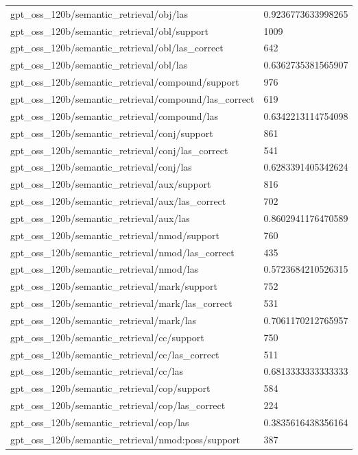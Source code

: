 \begin{tabular}{ll}
gpt\_oss\_120b/semantic\_retrieval/obj/las & 0.9236773633998265 \\
gpt\_oss\_120b/semantic\_retrieval/obl/support & 1009 \\
gpt\_oss\_120b/semantic\_retrieval/obl/las\_correct & 642 \\
gpt\_oss\_120b/semantic\_retrieval/obl/las & 0.6362735381565907 \\
gpt\_oss\_120b/semantic\_retrieval/compound/support & 976 \\
gpt\_oss\_120b/semantic\_retrieval/compound/las\_correct & 619 \\
gpt\_oss\_120b/semantic\_retrieval/compound/las & 0.6342213114754098 \\
gpt\_oss\_120b/semantic\_retrieval/conj/support & 861 \\
gpt\_oss\_120b/semantic\_retrieval/conj/las\_correct & 541 \\
gpt\_oss\_120b/semantic\_retrieval/conj/las & 0.6283391405342624 \\
gpt\_oss\_120b/semantic\_retrieval/aux/support & 816 \\
gpt\_oss\_120b/semantic\_retrieval/aux/las\_correct & 702 \\
gpt\_oss\_120b/semantic\_retrieval/aux/las & 0.8602941176470589 \\
gpt\_oss\_120b/semantic\_retrieval/nmod/support & 760 \\
gpt\_oss\_120b/semantic\_retrieval/nmod/las\_correct & 435 \\
gpt\_oss\_120b/semantic\_retrieval/nmod/las & 0.5723684210526315 \\
gpt\_oss\_120b/semantic\_retrieval/mark/support & 752 \\
gpt\_oss\_120b/semantic\_retrieval/mark/las\_correct & 531 \\
gpt\_oss\_120b/semantic\_retrieval/mark/las & 0.7061170212765957 \\
gpt\_oss\_120b/semantic\_retrieval/cc/support & 750 \\
gpt\_oss\_120b/semantic\_retrieval/cc/las\_correct & 511 \\
gpt\_oss\_120b/semantic\_retrieval/cc/las & 0.6813333333333333 \\
gpt\_oss\_120b/semantic\_retrieval/cop/support & 584 \\
gpt\_oss\_120b/semantic\_retrieval/cop/las\_correct & 224 \\
gpt\_oss\_120b/semantic\_retrieval/cop/las & 0.3835616438356164 \\
gpt\_oss\_120b/semantic\_retrieval/nmod:poss/support & 387 \\

\end{tabular}

